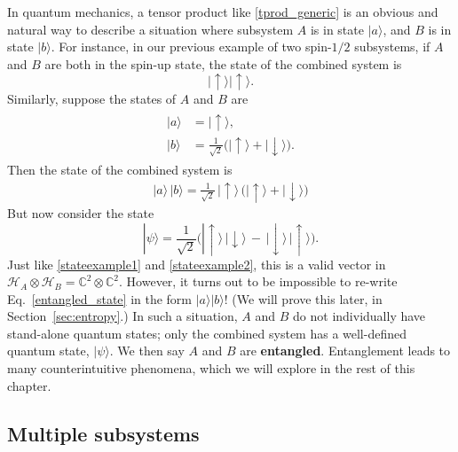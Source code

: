 \documentclass[pra,12pt]{revtex4-2}
\begin{document}
In quantum mechanics, a tensor product like \eqref{tprod_generic} is
an obvious and natural way to describe a situation where subsystem $A$
is in state $|a\rangle$, and $B$ is in state $|b\rangle$.  For
instance, in our previous example of two spin-$1/2$ subsystems, if $A$
and $B$ are both in the spin-up state, the state of the combined
system is
\begin{equation}
  |\!\uparrow\rangle |\!\uparrow\rangle.
  \label{stateexample1}
\end{equation}
Similarly, suppose the states of $A$ and $B$ are
\begin{align}
  \begin{aligned}
  |a\rangle &= |\!\uparrow\rangle,\\
  |b\rangle &= \frac{1}{\sqrt{2}}
  \Big(|\!\uparrow\rangle + |\!\downarrow\rangle\Big).
  \end{aligned}
\end{align}
Then the state of the combined system is
\begin{align}
  |a\rangle\, |b\rangle
  = \frac{1}{\sqrt{2}}\, |\!\uparrow\rangle\,
  \Big(|\!\uparrow\rangle + |\!\downarrow\rangle\Big)
  \label{stateexample2}
\end{align}
But now consider the state
\begin{equation}
  |\psi\rangle = \frac{1}{\sqrt{2}}
  \Big(|\!\uparrow\rangle\, |\!\downarrow\rangle
  \,-\, |\!\downarrow\rangle \, |\!\uparrow\rangle\Big).
  \label{entangled_state}
\end{equation}
Just like \eqref{stateexample1} and \eqref{stateexample2}, this is a
valid vector in $\mathscr{H}_A \otimes \mathscr{H}_B =
\mathbb{C}^2\otimes\mathbb{C}^2$.  However, it turns out to be
impossible to re-write Eq.~\eqref{entangled_state} in the form
$|a\rangle|b\rangle$!  (We will prove this later, in
Section~\ref{sec:entropy}.)  In such a situation, $A$ and $B$ do not
individually have stand-alone quantum states; only the combined system
has a well-defined quantum state, $|\psi\rangle$.  We then say $A$ and
$B$ are \textbf{entangled}.  Entanglement leads to many
counterintuitive phenomena, which we will explore in the rest of this
chapter.

\subsection{Multiple subsystems}
\end{document}
